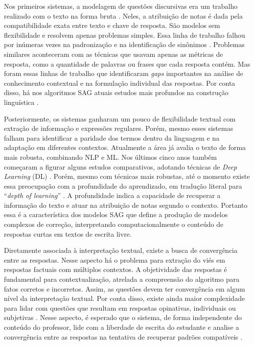 Nos primeiros sistemas, a modelagem de questões discursivas era um trabalho realizado com o texto na forma bruta \cite{perez-marin2009}. Neles, a atribuição de notas é dada pela compatibilidade exata entre texto e chave de resposta. São modelos sem flexibilidade e resolvem apenas problemas simples. Essa linha de trabalho falhou por inúmeras vezes na padronização e na identificação de sinônimos \cite{leffa2003}. Problemas similares aconteceram com as técnicas que usavam apenas as métricas de resposta, como a quantidade de palavras ou frases que cada resposta contém. Mas foram essas linhas de trabalho que identificaram \textit{gaps} importantes na análise de conhecimento contextual e na formulação individual das respostas. Por conta disso, há nos algoritmos SAG atuais estudos mais profundos na construção linguística \cite{filighera2020}.

Posteriormente, os sistemas ganharam um pouco de flexibilidade textual com extração de informação e expressões regulares. Porém, mesmo esses sistemas falham para identificar a paridade dos termos dentro da linguagem e na adaptação em diferentes contextos. Atualmente a área já avalia o texto de forma mais robusta, combinando NLP e ML. Nos últimos cinco anos também começaram a figurar alguns estudos comparativos, adotando técnicas de \textit{Deep Learning} (DL) \cite{bonthu2021}. Porém, mesmo com técnicas mais robustas, até o momento existe essa preocupação com a profundidade do aprendizado, em tradução literal para ``\textit{depth of learning}'' \cite{burrows2015}. A profundidade indica a capacidade de recuperar a informação do texto e atuar na atribuição de notas segundo o contexto. Portanto essa é a característica dos modelos SAG que define a produção de modelos complexos de correção, interpretando computacionalmente o conteúdo de respostas curtas em textos de escrita livre.

Diretamente associada à interpretação textual, existe a busca de convergência entre as respostas. Nesse aspecto há o problema para extração do viés em respostas factuais com múltiplos contextos. A objetividade das respostas é fundamental para contextualização, atrelada a compreensão do algoritmo para fatos corretos e incorretos. Assim, as questões devem ter convergência em algum nível da interpretação textual. Por conta disso, existe ainda maior complexidade para lidar com questões que resultam em respostas opinativas, individuais ou subjetivas \cite{bailey2008}. Nesse aspecto, é esperado que o sistema, de forma independente do conteúdo do professor, lide com a liberdade de escrita do estudante e analise a convergência entre as respostas na tentativa de recuperar padrões compatíveis \cite{saha2018, lui2022}.

